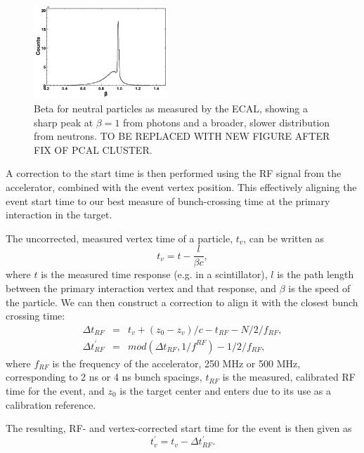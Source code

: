 \begin{figure}
\centering
\includegraphics[width=0.45\textwidth]{pics/neutral_beta.png}
\caption{Beta for neutral particles as measured by the ECAL, showing a sharp peak at $\beta=1$ from photons and a broader, slower distribution from neutrons. TO BE REPLACED WITH NEW FIGURE AFTER FIX OF PCAL CLUSTER.}
\label{fig:neutbeta}
\end{figure}

A correction to the start time is then performed using the RF signal from the accelerator, combined with the event vertex position.  This effectively aligning the event start time to our best measure of bunch-crossing time at the primary interaction in the target.

The uncorrected, measured vertex time of a particle, $t_v$, can be written as
\begin{equation}
    t_v = t-\frac{l}{\beta c},
\end{equation}
where $t$ is the measured time response (e.g. in a scintillator), $l$ is the path length between the primary interaction vertex and that response, and $\beta$ is the speed of the particle.  We can then construct a correction to align it with the closest bunch crossing time:
\begin{eqnarray*}
\Delta t_{RF} &=& t_v + (z_0-z_v)/c - t_{RF} - N/2/f_{RF}, \\
\Delta t^{\prime}_{RF} &=& mod(\Delta t_{RF},1/f^{RF})-1/2/f_{RF},
\end{eqnarray*}
where $f_{RF}$ is the frequency of the accelerator, 250 MHz or 500 MHz, corresponding to 2 ns or 4 ns bunch spacings, $t_{RF}$ is the measured, calibrated RF time for the event, and $z_0$ is the target center and enters due to its use as a calibration reference.

The resulting, RF- and vertex-corrected start time for the event is then given as
\begin{equation}\label{eq:starttime}
t^{\prime}_v = t_v - \Delta t^{\prime}_{RF}.
\end{equation}

